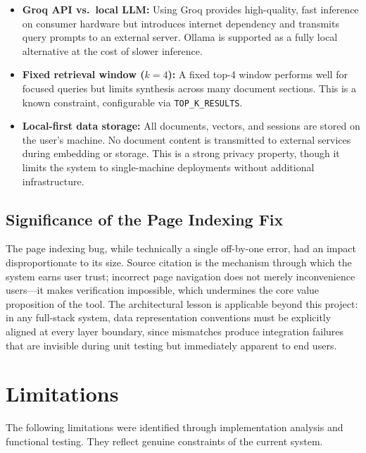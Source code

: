 \begin{itemize}[leftmargin=1.5em, itemsep=4pt]
    \item \textbf{Groq API vs.\ local LLM:} Using Groq provides
    high-quality, fast inference on consumer hardware but introduces
    internet dependency and transmits query prompts to an external
    server. Ollama is supported as a fully local alternative at the
    cost of slower inference.

    \item \textbf{Fixed retrieval window ($k=4$):} A fixed top-4
    window performs well for focused queries but limits synthesis
    across many document sections. This is a known constraint,
    configurable via \texttt{TOP\_K\_RESULTS}.

    \item \textbf{Local-first data storage:} All documents, vectors,
    and sessions are stored on the user's machine. No document content
    is transmitted to external services during embedding or storage.
    This is a strong privacy property, though it limits the system
    to single-machine deployments without additional infrastructure.
\end{itemize}

\subsection{Significance of the Page Indexing Fix}

The page indexing bug, while technically a single off-by-one error,
had an impact disproportionate to its size. Source citation is the
mechanism through which the system earns user trust; incorrect page
navigation does not merely inconvenience users---it makes verification
impossible, which undermines the core value proposition of the tool.
The architectural lesson is applicable beyond this project: in any
full-stack system, data representation conventions must be explicitly
aligned at every layer boundary, since mismatches produce integration
failures that are invisible during unit testing but immediately
apparent to end users.

\section{Limitations}

The following limitations were identified through implementation analysis
and functional testing. They reflect genuine constraints of the current
system.

